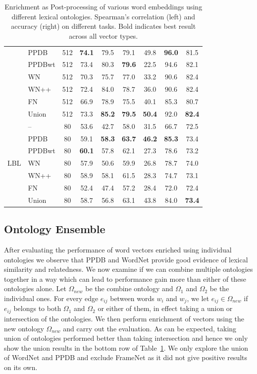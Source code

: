 \documentclass[11pt]{article}
\begin{document}
\begin{table}[!tbh]
\begin{tabular}{l|l|c||c|c|c||c|c||c}
& PPDB & 512 & \textbf{74.1} & 79.5 & 79.1 & 49.8 & \textbf{96.0} & 81.5\\
& PPDBwt & 512 & 73.4 & 80.3 & \textbf{79.6} & 22.5 & 94.6 & 82.1\\
& WN & 512 & 70.3 & 75.7 & 77.0 & 33.2 & 90.6 & 82.4 \\
& WN++ & 512 & 72.4 & 84.0 & 78.7 & 36.0 & 90.6 & 82.4 \\
& FN & 512 & 66.9 & 78.9 & 75.5 & 40.1 & 85.3 & 80.7\\
& Union & 512 & 73.3 & \textbf{85.2} & \textbf{79.5} & \textbf{50.4} & 92.0 & \textbf{82.4} \\
\hline\hline
\multirow{7}{*}{LBL} & -- & 80 & 53.6 & 42.7 & 58.0 & 31.5 & 66.7 & 72.5\\

& PPDB & 80 & 59.1 & \textbf{58.3} & \textbf{63.7} & \textbf{46.2} & \textbf{85.3} & 73.4\\
& PPDBwt & 80 & \textbf{60.1} & 57.8 & 62.1 & 27.3 & 78.6 & 73.2\\
& WN & 80 & 57.9 & 50.6 & 59.9 & 26.8 & 78.7 & 74.0\\
& WN++ & 80 & 58.9 & 58.1 & 61.5 & 28.3 & 74.7 & 73.1 \\
& FN & 80 & 52.4 & 47.4 & 57.2 & 28.4 & 72.0 & 72.4\\
& Union & 80 & 58.7 & 56.8 & 63.1 & 43.8 & 84.0 & \textbf{73.4}\\
\end{tabular}
   \caption{Enrichment as Post-processing of various word embeddings using different lexical 
   ontologies. Spearman's correlation (left) and accuracy (right) on different tasks. Bold indicates 
   best result across all vector types.}
  \label{tab:post-proc}
\end{table}

\subsection{Ontology Ensemble}

After evaluating the performance of word vectors enriched using individual 
ontologies we observe that PPDB and WordNet provide good evidence of lexical
similarity and relatedness. We now examine if we can combine multiple ontologies
together in a way which can lead to performance gain more than either of these ontologies alone.
Let $\Omega_{new}$ be the combine ontology and $\Omega_{1}$ and $\Omega_{2}$ be
the individual ones. For every edge $e_{ij}$ between words $w_i$ and $w_j$, we let
$e_{ij} \in \Omega_{new}$ if $e_{ij}$ belongs to both $\Omega_{1}$ and $\Omega_{2}$
or either of them, in effect taking a union or intersection of the ontologies.
We then perform enrichment of vectors using the new ontology $\Omega_{new}$ 
and carry out the evaluation.
As can be expected, taking union of ontologies performed better than taking intersection and hence we only show the union results in the bottom row of Table~\ref{tab:post-proc}.
We only explore the union of WordNet and PPDB and exclude FrameNet as it did not give positive results on its own.
\end{document}
